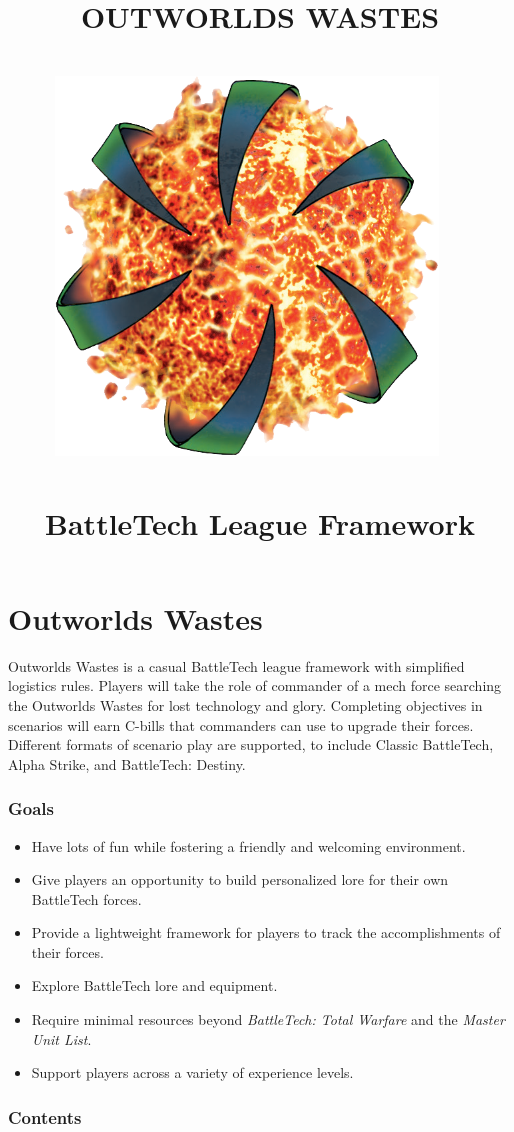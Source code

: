 \documentclass{article}
\title{
  \fontfamily{Montserrat-TOsF}\selectfont
  \huge\bf\MakeUppercase{Outworlds Wastes}\\
  ~\\
  \includegraphics[width=4in]{../img/Outworlds_Alliance.png}
  ~\\
  ~\\
  \large\bf{BattleTech League Framework} \\
}
\author{}
\date{}
\begin{document}
\maketitle

\newpage

\section{Outworlds Wastes}

Outworlds Wastes is a casual BattleTech league framework with simplified logistics rules.
Players will take the role of commander of a mech force searching the Outworlds Wastes for lost technology and glory.
Completing objectives in scenarios will earn C-bills that commanders can use to upgrade their forces.
Different formats of scenario play are supported, to include Classic BattleTech, Alpha Strike, and BattleTech: Destiny.\\

\subsubsection*{Goals}

\begin{itemize}

\item Have lots of fun while fostering a friendly and welcoming environment.

\item Give players an opportunity to build personalized lore for their own BattleTech forces.

\item Provide a lightweight framework for players to track the accomplishments of their forces.

\item Explore BattleTech lore and equipment.

\item Require minimal resources beyond \emph{BattleTech: Total Warfare} and the \emph{Master Unit List}.

\item Support players across a variety of experience levels.

\end{itemize}

\subsubsection*{Contents}
\end{document}
